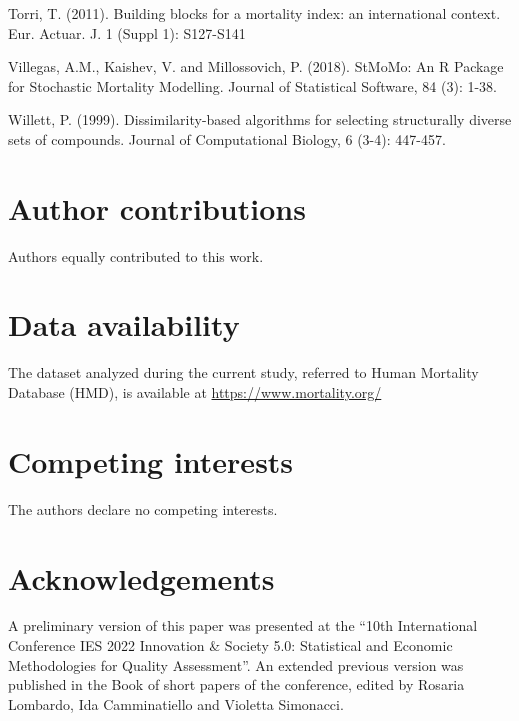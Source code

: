 \documentclass[fleqn,10pt]{wlscirep}
\begin{document}
\begin{thebibliography}{99}
Torri, T. (2011). Building blocks for a mortality index: an international context. Eur. Actuar. J. 1 (Suppl 1): S127-S141

Villegas, A.M., Kaishev, V. and Millossovich, P. (2018). StMoMo: An R Package for Stochastic Mortality Modelling. Journal of Statistical Software, 84 (3): 1-38.

Willett, P. (1999). Dissimilarity-based algorithms for selecting structurally diverse sets of compounds. Journal of Computational Biology, 6 (3-4): 447-457.
 
\end{thebibliography}


\section*{Author contributions}
Authors equally contributed to this work.

\section*{Data availability}
The dataset analyzed during the current study, referred to Human Mortality Database (HMD), is available at \url{https://www.mortality.org/}

\section*{Competing interests}
The authors declare no competing interests.

\section*{Acknowledgements}
A preliminary version of this paper was presented at the “10th International Conference IES 2022 Innovation \& Society 5.0: Statistical and Economic Methodologies for Quality Assessment”. An extended previous version was published in the Book of short papers of the conference, edited by Rosaria Lombardo, Ida Camminatiello and Violetta Simonacci.
\end{document}
